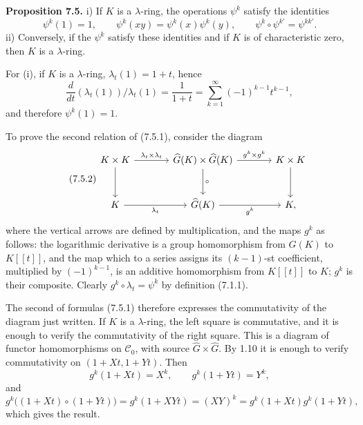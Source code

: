 \documentclass[11pt]{article}
\begin{document}
\textbf{Proposition 7.5.} i) If \(K\) is a \(\lambda\)-ring, the operations \(\psi^k\) satisfy the identities
\begin{equation}\tag{7.5.1}
  \psi^k(1)=1,\qquad
  \psi^k(xy)=\psi^k(x)\psi^k(y),\qquad
  \psi^k\circ\psi^{k'}=\psi^{kk'}.
\end{equation}
ii) Conversely, if the \(\psi^k\) satisfy these identities and if \(K\) is of characteristic zero, then \(K\) is a \(\lambda\)-ring.

For (i), if \(K\) is a \(\lambda\)-ring, \(\lambda_t(1)=1+t\), hence
\[
  \frac{d}{dt}(\lambda_t(1))/\lambda_t(1)
  =
  \frac1{1+t}
  =
  \sum_{k=1}^{\infty}(-1)^{k-1}t^{k-1},
\]
and therefore \(\psi^k(1)=1\).

To prove the second relation of (7.5.1), consider the diagram
\begin{equation}\tag{7.5.2}
\begin{tikzcd}[column sep=large,row sep=large]
K\times K \arrow[r,"\lambda_t\times\lambda_t"] \arrow[d] &
\widehat G(K)\times\widehat G(K) \arrow[r,"g^k\times g^k"] \arrow[d,"\circ"] &
K\times K \arrow[d]\\
K \arrow[r,"\lambda_t"'] &
\widehat G(K) \arrow[r,"g^k"'] &
K ,
\end{tikzcd}
\end{equation}
where the vertical arrows are defined by multiplication, and the maps \(g^k\) as follows: the logarithmic derivative is a group homomorphism from \(G(K)\) to \(K[[t]]\), and the map which to a series assigns its \((k-1)\)-st coefficient, multiplied by \((-1)^{k-1}\), is an additive homomorphism from \(K[[t]]\) to \(K\); \(g^k\) is their composite. Clearly \(g^k\circ\lambda_t=\psi^k\) by definition (7.1.1).

The second of formulas (7.5.1) therefore expresses the commutativity of the diagram just written. If \(K\) is a \(\lambda\)-ring, the left square is commutative, and it is enough to verify the commutativity of the right square. This is a diagram of functor homomorphisms on \(\mathscr C_0\), with source \(\widehat G\times\widehat G\). By 1.10 it is enough to verify commutativity on \((1+Xt,1+Yt)\). Then
\[
  g^k(1+Xt)=X^k,\qquad
  g^k(1+Yt)=Y^k,
\]
and
\[
  g^k\bigl((1+Xt)\circ(1+Yt)\bigr)
  =
  g^k(1+XYt)
  =
  (XY)^k
  =
  g^k(1+Xt)g^k(1+Yt),
\]
which gives the result.
\end{document}
